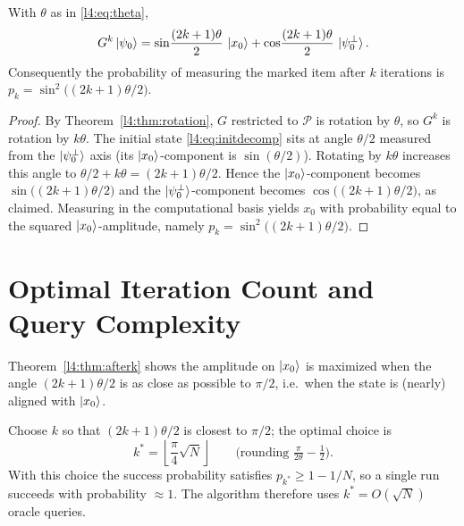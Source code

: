 \begin{theorem}
\label{l4:thm:afterk}
With $\theta$ as in \eqref{l4:eq:theta},
\[
  G^{k}\ket{\psi_0}
    =\sin\!\frac{(2k+1)\theta}{2}\,\ket{x_0}
     +\cos\!\frac{(2k+1)\theta}{2}\,\ket{\psi_0^{\perp}}.
\]
Consequently the probability of measuring the marked item after $k$ iterations is
$p_k=\sin^{2}\!\bigl((2k+1)\theta/2\bigr)$.
\end{theorem}

\begin{proof}
By Theorem~\ref{l4:thm:rotation}, $G$ restricted to $\mathcal P$ is rotation by
$\theta$, so $G^{k}$ is rotation by $k\theta$. The initial state
\eqref{l4:eq:initdecomp} sits at angle $\theta/2$ measured from the
$\ket{\psi_0^{\perp}}$ axis (its $\ket{x_0}$-component is
$\sin(\theta/2)$). Rotating by $k\theta$ increases this angle to
$\theta/2+k\theta=(2k+1)\theta/2$. Hence the $\ket{x_0}$-component becomes
$\sin\bigl((2k+1)\theta/2\bigr)$ and the $\ket{\psi_0^{\perp}}$-component becomes
$\cos\bigl((2k+1)\theta/2\bigr)$, as claimed. Measuring in the computational basis
yields $x_0$ with probability equal to the squared $\ket{x_0}$-amplitude, namely
$p_k=\sin^{2}\bigl((2k+1)\theta/2\bigr)$.
\end{proof}

\section{Optimal Iteration Count and Query Complexity}

Theorem~\ref{l4:thm:afterk} shows the amplitude on $\ket{x_0}$ is maximized when the
angle $(2k+1)\theta/2$ is as close as possible to $\pi/2$, i.e.\ when the state is
(nearly) aligned with $\ket{x_0}$.

\begin{theorem}
\label{l4:thm:kstar}
Choose $k$ so that $(2k+1)\theta/2$ is closest to $\pi/2$; the optimal choice is
\[
  k^{\ast}=\left\lfloor\frac{\pi}{4}\sqrt N\right\rfloor
  \qquad\bigl(\text{rounding } \tfrac{\pi}{2\theta}-\tfrac12\bigr).
\]
With this choice the success probability satisfies $p_{k^{\ast}}\ge 1-1/N$, so a
single run succeeds with probability $\approx1$. The algorithm therefore uses
$k^{\ast}=O(\sqrt N)$ oracle queries.
\end{theorem}

